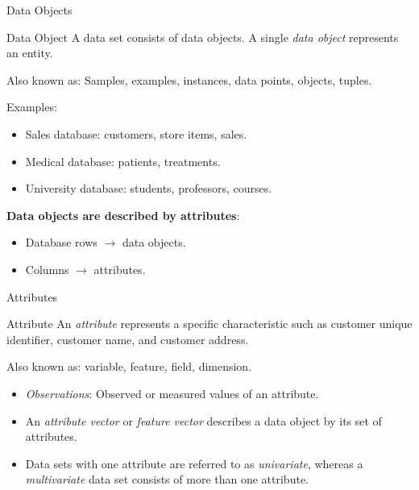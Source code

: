 \begin{frame}{Data Objects}
	\begin{block}{Data Object}
		A data set consists of data objects. A single \textit{data object} represents an entity.
	\end{block}

	Also known as: Samples, examples, instances, data points, objects, tuples.\\\medskip

	Examples:
	\begin{itemize}
		\item Sales database: customers, store items, sales.
		\item Medical database: patients, treatments.
		\item University database: students, professors, courses.
	\end{itemize}

	\textbf{Data objects are described by attributes}:
	\begin{itemize}
		\item Database rows $\rightarrow$ data objects.
		\item Columns $\rightarrow$ attributes.
	\end{itemize}
\end{frame}

\begin{frame}{Attributes}
	\begin{block}{Attribute}
		An \textit{attribute} represents a specific characteristic such as customer
		unique identifier, customer name, and customer address.
	\end{block}

	Also known as: variable, feature, field, dimension.\\\medskip


	\begin{itemize}
		\item \textit{Observations}: Observed or measured values of an attribute.
		\item An \textit{attribute vector} or \textit{feature vector} describes a
		      data object by its set of attributes.
		\item Data sets with one attribute are referred to as \textit{univariate},
		      whereas a \textit{multivariate} data set consists of more than one
		      attribute.
	\end{itemize}
\end{frame}

